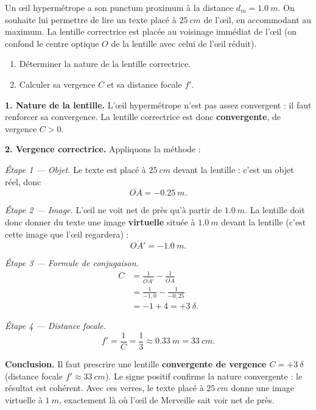 \documentclass[11pt]{article}
\begin{document}
\begin{exoresolu}
Un œil hypermétrope a son punctum proximum à la distance $d_m = \SI{1,0}{m}$. On souhaite lui permettre de lire un texte placé à $\SI{25}{cm}$ de l'œil, en accommodant au maximum. La lentille correctrice est placée au voisinage immédiat de l'œil (on confond le centre optique $O$ de la lentille avec celui de l'œil réduit).
\begin{enumerate}
\item Déterminer la nature de la lentille correctrice.
\item Calculer sa vergence $C$ et sa distance focale $f'$.
\end{enumerate}
\tcblower
\textbf{1. Nature de la lentille.} L'œil hypermétrope n'est pas assez convergent : il faut renforcer sa convergence. La lentille correctrice est donc \textbf{convergente}, de vergence $C > 0$.

\textbf{2. Vergence correctrice.} Appliquons la méthode :

\emph{Étape 1 — Objet.} Le texte est placé à $\SI{25}{cm}$ devant la lentille : c'est un objet réel, donc
\[ \overline{OA} = -\SI{0,25}{m}. \]

\emph{Étape 2 — Image.} L'œil ne voit net de près qu'à partir de $\SI{1,0}{m}$. La lentille doit donc donner du texte une image \textbf{virtuelle} située à $\SI{1,0}{m}$ devant la lentille (c'est cette image que l'œil regardera) :
\[ \overline{OA'} = -\SI{1,0}{m}. \]

\emph{Étape 3 — Formule de conjugaison.}
\begin{align*}
C &= \frac{1}{\overline{OA'}} - \frac{1}{\overline{OA}} \\
&= \frac{1}{-1{,}0} - \frac{1}{-0{,}25} \\
&= -1 + 4 = +3\ \delta.
\end{align*}

\emph{Étape 4 — Distance focale.}
\[ f' = \frac{1}{C} = \frac{1}{3} \approx \SI{0,33}{m} = \SI{33}{cm}. \]

\textbf{Conclusion.} Il faut prescrire une lentille \textbf{convergente de vergence $C = +3\ \delta$} (distance focale $f' \approx \SI{33}{cm}$). Le signe positif confirme la nature convergente : le résultat est cohérent. Avec ces verres, le texte placé à $\SI{25}{cm}$ donne une image virtuelle à $\SI{1}{m}$, exactement là où l'œil de Merveille sait voir net de près.
\end{exoresolu}
\end{document}
